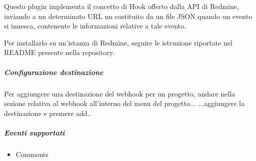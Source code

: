 	Questo plugin implementa il concetto di Hook offerto dalla API di Redmine, inviando a un determinato URL
	un  costituito da un file JSON quando un evento si innesca, contenente le informazioni relative
	a tale evento.
	
	Per installarlo su un'istanza di Redmine, seguire le istruzione riportate nel README presente nella repository.
	
		\subparagraph{Configurazione destinazione}
		Per aggiungere una destinazione del webhook per un progetto, andare nella sezione relativa al webhook all'interno del menu del progetto...
		...aggiungere la destinazione e premere add..
	
		\subparagraph{Eventi supportati}
		\begin{itemize}
			\item Comments
		\end{itemize}
	
		
